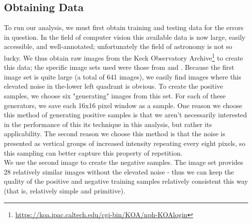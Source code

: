 \documentclass[twocolumn,longauthor]{aastex61}
\begin{document}
\subsection{Obtaining Data} \label{subsec:data}
\noindent To run our analysis, we must first obtain training and testing data for the errors in question. In the field of computer vision this available data is now large, easily accessible, and well-annotated; unfortunately the field of astronomy is not so lucky. We thus obtain raw images from the Keck Observatory Archive\footnote{\url{https://koa.ipac.caltech.edu/cgi-bin/KOA/nph-KOAlogin}} to create this data; the specific image sets used were those from \citet{2006ApJ..649..306} and \cite{2016ApJ..827..16}.\newpage
\indent Because the first image set is quite large (a total of 641 images), we easily find images where this elevated noise in the-lower left quadrant is obvious. To create the positive samples, we choose six "generating" images from this set. For each of these generators, we save each 16x16 pixel window as a sample. One reason we choose this method of generating positive samples is that we aren't necessarily interested in the performance of this its technique in this analysis, but rather its applicability. The second reason we choose this method is that the noise is presented as vertical groups of increased intensity repeating every eight pixels, so this sampling can better capture this property of repetition.\\
\indent We use the second image to create the negative samples. The image set provides 28 relatively similar images without the elevated noise - thus we can keep the quality of the positive and negative training samples relatively consistent this way (that is, relatively simple and primitive). 
\end{document}
